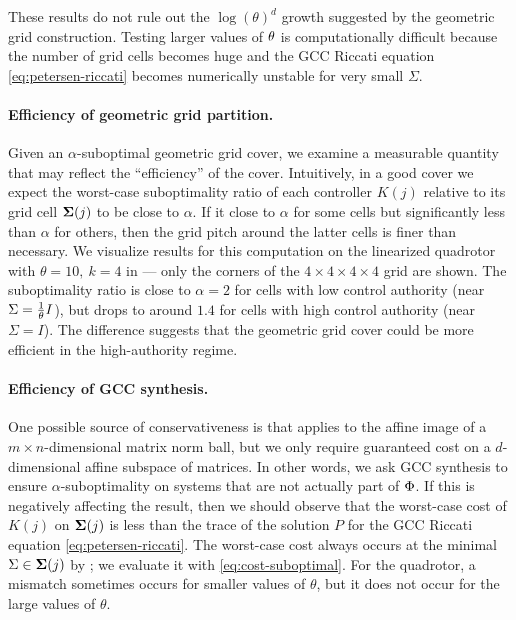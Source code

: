 These results do not rule out
the $\log(\theta)^d$ growth suggested by
the geometric grid construction.
Testing larger values of $\theta$
is computationally difficult because the number of grid cells becomes huge
and the GCC Riccati equation \eqref{eq:petersen-riccati}
becomes numerically unstable for very small $\Sigma$.

\paragraph{Efficiency of geometric grid partition.}
\label{sec:are-geometric-efficient}

Given an $\alpha$-suboptimal geometric grid cover,
we examine a measurable quantity that may reflect the ``efficiency'' of the cover.
Intuitively,
in a good cover we expect 
the worst-case suboptimality ratio of each controller $K(j)$ relative to its grid cell $\boldsymbol\Sigma(j)$
to be close to $\alpha$.
If it close to $\alpha$ for some cells but significantly less than $\alpha$ for others,
then the grid pitch around the latter cells is finer than necessary.
We visualize results for this computation on the linearized quadrotor
with $\theta = 10,\ k = 4$
in 
---
only the corners of the $4 \times 4 \times 4 \times 4$ grid are shown.
The suboptimality ratio is close to $\alpha = 2$
for cells with low control authority (near $\Sigma = \frac{1}{\theta} I$),
but drops to around $1.4$
for cells with high control authority (near $\Sigma = I$).
The difference suggests that the geometric grid cover could be more efficient in the high-authority regime.

\paragraph{Efficiency of GCC synthesis.}
One possible source of conservativeness is that
 applies to the affine image of
a $m \times n$-dimensional matrix norm ball,
but we only require guaranteed cost on
a $d$-dimensional affine subspace of matrices.
In other words, we ask GCC synthesis to ensure $\alpha$-suboptimality on systems that are not actually part of $\Phi$.
If this is negatively affecting the result,
then we should observe that the worst-case cost of $K(j)$ on $\boldsymbol\Sigma(j)$
is less than the trace of the solution $P$ for the GCC Riccati equation \eqref{eq:petersen-riccati}.
The worst-case cost always occurs at the minimal $\Sigma \in \boldsymbol\Sigma(j)$ by ;
we evaluate it with \eqref{eq:cost-suboptimal}.
For the quadrotor,
a mismatch sometimes occurs for smaller values of $\theta$,
but it does not occur for the large values of $\theta$.

